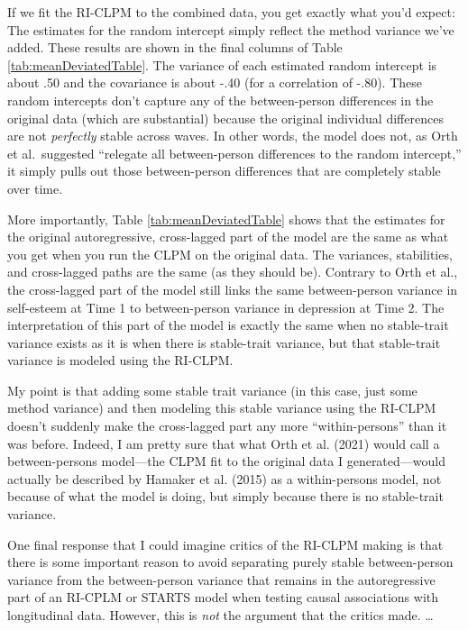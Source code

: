 \documentclass[
  english,
  man,floatsintext]{apa6}
\begin{document}
If we fit the RI-CLPM to the combined data, you get exactly what you'd expect: The estimates for the random intercept simply reflect the method variance we've added. These results are shown in the final columns of Table \ref{tab:meanDeviatedTable}. The variance of each estimated random intercept is about .50 and the covariance is about -.40 (for a correlation of -.80). These random intercepts don't capture any of the between-person differences in the original data (which are substantial) because the original individual differences are not \emph{perfectly} stable across waves. In other words, the model does not, as Orth et al.~suggested ``relegate all between-person differences to the random intercept,'' it simply pulls out those between-person differences that are completely stable over time.

More importantly, Table \ref{tab:meanDeviatedTable} shows that the estimates for the original autoregressive, cross-lagged part of the model are the same as what you get when you run the CLPM on the original data. The variances, stabilities, and cross-lagged paths are the same (as they should be). Contrary to Orth et al., the cross-lagged part of the model still links the same between-person variance in self-esteem at Time 1 to between-person variance in depression at Time 2. The interpretation of this part of the model is exactly the same when no stable-trait variance exists as it is when there is stable-trait variance, but that stable-trait variance is modeled using the RI-CLPM.

My point is that adding some stable trait variance (in this case, just some method variance) and then modeling this stable variance using the RI-CLPM doesn't suddenly make the cross-lagged part any more ``within-persons'' than it was before. Indeed, I am pretty sure that what Orth et al. (2021) would call a between-persons model---the CLPM fit to the original data I generated---would actually be described by Hamaker et al. (2015) as a within-persons model, not because of what the model is doing, but simply because there is no stable-trait variance.

One final response that I could imagine critics of the RI-CLPM making is that there is some important reason to avoid separating purely stable between-person variance from the between-person variance that remains in the autoregressive part of an RI-CPLM or STARTS model when testing causal associations with longitudinal data. However, this is \emph{not} the argument that the critics made. \ldots{}
\end{document}
